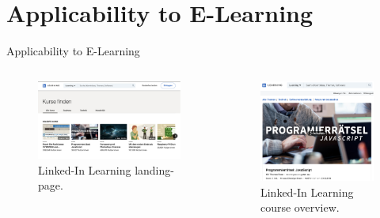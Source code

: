 \documentclass[en]{sdqbeamer}
\begin{document}
\section{Applicability to E-Learning}
\begin{frame}{Applicability to E-Learning}
	\begin{columns}
		\begin{figure}
			\includegraphics[height=0.55\textheight]{images/linked_in_landing.pdf}
			\caption{Linked-In Learning landing-page. \cite{LinkedInLearningMit}}
		\end{figure}
		\begin{figure}
			\includegraphics[height=0.6\textheight]{images/linked_in_course.pdf}
			\caption{Linked-In Learning course overview. \cite{LinkedInLearningMit}}
		\end{figure}
	\end{columns}
\end{frame}
\end{document}
